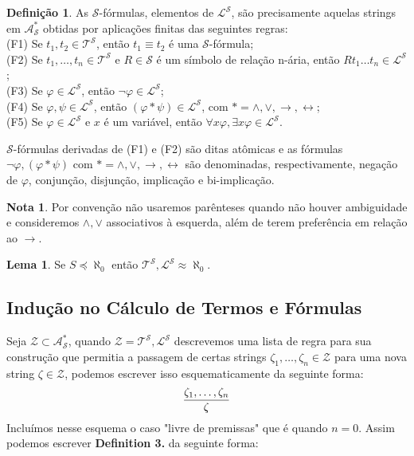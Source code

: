 \documentclass[11pt]{article}
\theoremstyle{definition}
\newtheorem{defn}{Definição}
\newtheorem{note}{Nota}
\newtheorem{lemma}{Lema}
\newcommand{\sse}{\leftrightarrow}
\newcommand{\mc}[1]{\mathcal{#1}}
\begin{document}
\begin{shaded}
\begin{defn}
As $\mc{S}$-fórmulas, elementos de $\mc{L}^\mc{S}$, são precisamente aquelas strings em $\mc{A}_\mc{S}^*$ obtidas por aplicações finitas das seguintes regras:\\
(F1) Se $t_1,t_2\in\mc{T}^\mc{S}$, então $t_1\equiv t_2$ é uma $\mc{S}$-fórmula;\\
(F2) Se $t_1,\dots,t_n\in\mc{T}^\mc{S}$ e $R\in\mc{S}$ é um símbolo de relação n-ária, então $Rt_1\dots t_n\in\mc{L}^\mc{S}$;\\
(F3) Se $\varphi\in\mc{L}^\mc{S}$, então $\neg\varphi\in\mc{L}^\mc{S}$;\\
(F4) Se $\varphi,\psi\in\mc{L}^\mc{S}$, então $(\varphi*\psi)\in\mc{L}^\mc{S}$, com $*=\wedge,\vee,\to,\sse$;\\
(F5) Se $\varphi\in\mc{L}^\mc{S}$ e $x$ é um variável, então $\forall x\varphi,\exists x\varphi\in\mc{L}^\mc{S}$.
\end{defn}
\end{shaded}

$\mc{S}$-fórmulas derivadas de (F1) e (F2) são ditas atômicas e as fórmulas $\neg\varphi,(\varphi*\psi)$ com $*=\wedge,\vee,\to,\sse$ são denominadas, respectivamente, negação de $\varphi$, conjunção, disjunção, implicação e bi-implicação.

\begin{note}
Por convenção não usaremos parênteses quando não houver ambiguidade e consideremos $\wedge,\vee$ associativos à esquerda, além de terem preferência em relação ao $\to$.
\end{note}

\begin{lemma}
Se $S\preceq\aleph_0$ então $\mc{T}^\mc{S},\mc{L}^\mc{S}\approx\aleph_0$.
\end{lemma}

\subsection{Indução no Cálculo de Termos e Fórmulas}
Seja $\mc{Z}\subset\mc{A}_\mc{S}^*$, quando $\mc{Z}=\mc{T}^\mc{S},\mc{L}^\mc{S}$ descrevemos uma lista de regra para sua construção que permitia a passagem de certas strings $\zeta_1,\dots,\zeta_n\in\mc{Z}$ para uma nova string $\zeta\in\mc{Z}$, podemos escrever isso esquematicamente da seguinte forma:
\[
\infer{\zeta}{\zeta_1,\dots,\zeta_n}
\]
Incluímos nesse esquema o caso "livre de premissas" que é quando $n=0$. Assim podemos escrever \textbf{Definition 3.} da seguinte forma:
\end{document}
